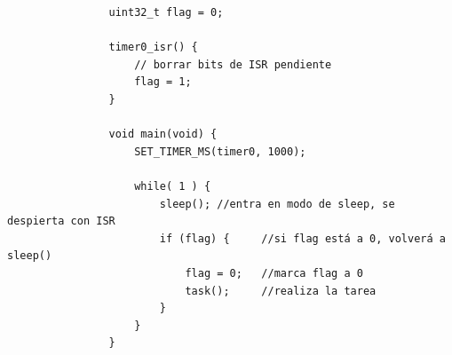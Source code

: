 \documentclass[../main.tex]{subfiles}
\begin{document}
            \begin{lstlisting}
                uint32_t flag = 0;

                timer0_isr() {
                    // borrar bits de ISR pendiente
                    flag = 1;
                }

                void main(void) { 
                    SET_TIMER_MS(timer0, 1000); 

                    while( 1 ) { 
                        sleep(); //entra en modo de sleep, se despierta con ISR
                        if (flag) {     //si flag está a 0, volverá a sleep()
                            flag = 0;   //marca flag a 0 
                            task();     //realiza la tarea
                        }
                    } 
                }
            \end{lstlisting}
\end{document}
